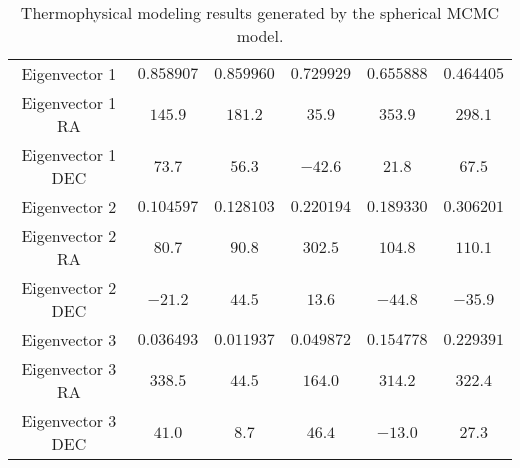 \begin{table}[H]
\begin{tabular}{c|c|c|c|c|c}
        Eigenvector 1 & $0.858907$ & $0.859960$ & $0.729929$ & $0.655888$ & $0.464405$ \\ 
        Eigenvector 1 RA & $145.9$ & $181.2$ & $35.9$ & $353.9$ & $298.1$ \\ 
        Eigenvector 1 DEC & $73.7$ & $56.3$ & $-42.6$ & $21.8$ & $67.5$ \\ 
        Eigenvector 2 & $0.104597$ & $0.128103$ & $0.220194$ & $0.189330$ & $0.306201$ \\ 
        Eigenvector 2 RA & $80.7$ & $90.8$ & $302.5$ & $104.8$ & $110.1$ \\ 
        Eigenvector 2 DEC & $-21.2$ & $44.5$ & $13.6$ & $-44.8$ & $-35.9$ \\ 
        Eigenvector 3 & $0.036493$ & $0.011937$ & $0.049872$ & $0.154778$ & $0.229391$ \\ 
        Eigenvector 3 RA & $338.5$ & $44.5$ & $164.0$ & $314.2$ & $322.4$ \\ 
        Eigenvector 3 DEC & $41.0$ & $8.7$ & $46.4$ & $-13.0$ & $27.3$ \\ 
    \end{tabular}
    \caption{Thermophysical modeling results generated by the spherical MCMC model.}
\end{table}